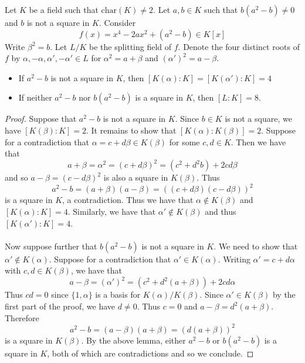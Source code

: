 \documentclass[a4paper]{article}
\begin{document}
\begin{prp}{}{} Let $K$ be a field such that $\text{char}(K)\neq 2$. Let $a,b\in K$ such that $b(a^2-b)\neq 0$ and $b$ is not a square in $K$. Consider $$f(x)=x^4-2ax^2+(a^2-b)\in K[x]$$ Write $\beta^2=b$. Let $L/K$ be the splitting field of $f$. Denote the four distinct roots of $f$ by $\alpha,-\alpha,\alpha',-\alpha'\in L$ for $\alpha^2=a+\beta$ and $(\alpha')^2=a-\beta$. 
\begin{itemize}
\item If $a^2-b$ is not a square in $K$, then $[K(\alpha):K]=[K(\alpha'):K]=4$
\item If neither $a^2-b$ nor $b(a^2-b)$ is a square in $K$, then $[L:K]=8$. 
\end{itemize} \tcbline
\begin{proof}
Suppose that $a^2-b$ is not a square in $K$. Since $b\in K$ is not a square, we have $[K(\beta):K]=2$. It remains to show that $[K(\alpha):K(\beta)]=2$. Suppose for a contradiction that $\alpha=c+d\beta\in K(\beta)$ for some $c,d\in K$. Then we have that $$a+\beta=\alpha^2=(c+d\beta)^2=(c^2+d^2b)+2cd\beta$$ and so $a-\beta=(c-d\beta)^2$ is also a square in $K(\beta)$. Thus $$a^2-b=(a+\beta)(a-\beta)=((c+d\beta)(c-d\beta))^2$$ is a square in $K$, a contradiction. Thus we have that $\alpha\notin K(\beta)$ and $[K(\alpha):K]=4$. Similarly, we have that $\alpha'\notin K(\beta)$ and thus $[K(\alpha'):K]=4$. \\~\\

Now suppose further that $b(a^2-b)$ is not a square in $K$. We need to show that $\alpha'\notin K(\alpha)$. Suppose for a contradiction that $\alpha'\in K(\alpha)$. Writing $\alpha'=c+d\alpha$ with $c,d\in K(\beta)$, we have that $$a-\beta=(\alpha')^2=(c^2+d^2(a+\beta))+2cd\alpha$$ Thus $cd=0$ since $\{1,\alpha\}$ is a basis for $K(\alpha)/K(\beta)$. Since $\alpha'\in K(\beta)$ by the first part of the proof, we have $d\neq 0$. Thus $c=0$ and $a-\beta=d^2(a+\beta)$. Therefore $$a^2-b=(a-\beta)(a+\beta)=(d(a+\beta))^2$$ is a square in $K(\beta)$. By the above lemma, either $a^2-b$ or $b(a^2-b)$ is a square in $K$, both of which are contradictions and so we conclude. 
\end{proof}
\end{prp}
\end{document}
